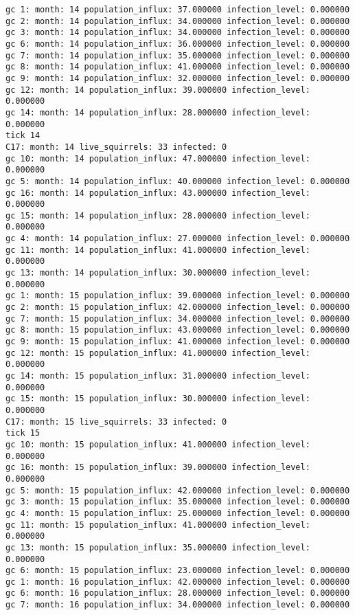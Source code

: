 \begin{lstlisting}[basicstyle=\tiny]
gc 1: month: 14 population_influx: 37.000000 infection_level: 0.000000
gc 2: month: 14 population_influx: 34.000000 infection_level: 0.000000
gc 3: month: 14 population_influx: 34.000000 infection_level: 0.000000
gc 6: month: 14 population_influx: 36.000000 infection_level: 0.000000
gc 7: month: 14 population_influx: 35.000000 infection_level: 0.000000
gc 8: month: 14 population_influx: 41.000000 infection_level: 0.000000
gc 9: month: 14 population_influx: 32.000000 infection_level: 0.000000
gc 12: month: 14 population_influx: 39.000000 infection_level: 0.000000
gc 14: month: 14 population_influx: 28.000000 infection_level: 0.000000
tick 14
C17: month: 14 live_squirrels: 33 infected: 0
gc 10: month: 14 population_influx: 47.000000 infection_level: 0.000000
gc 5: month: 14 population_influx: 40.000000 infection_level: 0.000000
gc 16: month: 14 population_influx: 43.000000 infection_level: 0.000000
gc 15: month: 14 population_influx: 28.000000 infection_level: 0.000000
gc 4: month: 14 population_influx: 27.000000 infection_level: 0.000000
gc 11: month: 14 population_influx: 41.000000 infection_level: 0.000000
gc 13: month: 14 population_influx: 30.000000 infection_level: 0.000000
gc 1: month: 15 population_influx: 39.000000 infection_level: 0.000000
gc 2: month: 15 population_influx: 42.000000 infection_level: 0.000000
gc 7: month: 15 population_influx: 34.000000 infection_level: 0.000000
gc 8: month: 15 population_influx: 43.000000 infection_level: 0.000000
gc 9: month: 15 population_influx: 41.000000 infection_level: 0.000000
gc 12: month: 15 population_influx: 41.000000 infection_level: 0.000000
gc 14: month: 15 population_influx: 31.000000 infection_level: 0.000000
gc 15: month: 15 population_influx: 30.000000 infection_level: 0.000000
C17: month: 15 live_squirrels: 33 infected: 0
tick 15
gc 10: month: 15 population_influx: 41.000000 infection_level: 0.000000
gc 16: month: 15 population_influx: 39.000000 infection_level: 0.000000
gc 5: month: 15 population_influx: 42.000000 infection_level: 0.000000
gc 3: month: 15 population_influx: 35.000000 infection_level: 0.000000
gc 4: month: 15 population_influx: 25.000000 infection_level: 0.000000
gc 11: month: 15 population_influx: 41.000000 infection_level: 0.000000
gc 13: month: 15 population_influx: 35.000000 infection_level: 0.000000
gc 6: month: 15 population_influx: 23.000000 infection_level: 0.000000
gc 1: month: 16 population_influx: 42.000000 infection_level: 0.000000
gc 6: month: 16 population_influx: 28.000000 infection_level: 0.000000
gc 7: month: 16 population_influx: 34.000000 infection_level: 0.000000

\end{lstlisting}
